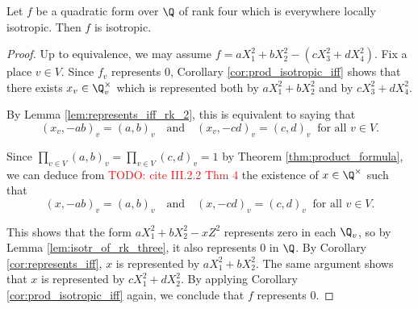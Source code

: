 \begin{lemma}\label{lem:isotr_of_rk_four}
\leanok
Let $f$ be a quadratic form over $\Q$ of rank four which is everywhere locally isotropic. Then $f$ is isotropic.
\end{lemma}
\begin{proof}
Up to equivalence, we may assume $f = aX_1^2 + bX_2^2 - (cX_3^2 + dX_4^2)$. Fix a place $v \in V$. Since $f_v$ represents $0$, Corollary \ref{cor:prod_isotropic_iff} shows that there exists $x_v \in \Q_v^\times$ which is represented both by $aX_1^2 + bX_2^2$ and by  $cX_3^2 + dX_4^2$.

By Lemma \ref{lem:represents_iff_rk_2}, this is equivalent to saying that 
\[ (x_v, -ab)_v = (a, b)_v \quad \text{and} \quad (x_v, -cd)_v = (c, d)_v \: \text{ for all } v \in V. \]

Since $\displaystyle \prod_{v \in V} (a, b)_v = \prod_{v \in V} (c, d)_v = 1$ by Theorem \ref{thm:product_formula}, we can deduce from \textcolor{red}{TODO: cite III.2.2 Thm 4} the existence of $x \in \Q^\times$ such that 
\[ (x, -ab)_v = (a, b)_v \quad \text{and} \quad (x, -cd)_v = (c, d)_v \: \text{ for all } v \in V. \]

This shows that the form $aX_1^2 + bX_2^2 - xZ^2$ represents zero in each $\Q_v$, so by Lemma \ref{lem:isotr_of_rk_three}, it also represents $0$ in $\Q$. By Corollary \ref{cor:represents_iff}, $x$ is represented by $aX_1^2 + bX_2^2$. The same argument shows that $x$ is represented by $cX_1^2 + dX_2^2$. By applying Corollary \ref{cor:prod_isotropic_iff} again, we conclude that $f$ represents $0$.
\end{proof}

